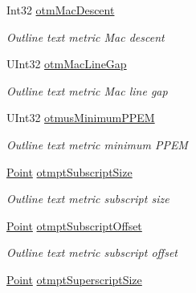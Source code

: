 \begin{DoxyCompactItemize}
Int32 \hyperlink{class_pdf_file_writer_1_1_win_outline_text_metric_aa7dee7dc0aed33e1b7d9a75ba41b73ac}{otm\+Mac\+Descent}
\begin{DoxyCompactList}\small\item\em Outline text metric Mac descent \end{DoxyCompactList}\item 
U\+Int32 \hyperlink{class_pdf_file_writer_1_1_win_outline_text_metric_a998724ff4d6cafd02b16752afe93d433}{otm\+Mac\+Line\+Gap}
\begin{DoxyCompactList}\small\item\em Outline text metric Mac line gap \end{DoxyCompactList}\item 
U\+Int32 \hyperlink{class_pdf_file_writer_1_1_win_outline_text_metric_ae5ab34c524bb3efb5126364c3068d582}{otmus\+Minimum\+P\+P\+EM}
\begin{DoxyCompactList}\small\item\em Outline text metric minimum P\+P\+EM \end{DoxyCompactList}\item 
\hyperlink{namespace_pdf_file_writer_adf167276d483eb5d597fed4e3297ba17a2a3cd5946cfd317eb99c3d32e35e2d4c}{Point} \hyperlink{class_pdf_file_writer_1_1_win_outline_text_metric_aacfcfe5ed598325813742685681f762a}{otmpt\+Subscript\+Size}
\begin{DoxyCompactList}\small\item\em Outline text metric subscript size \end{DoxyCompactList}\item 
\hyperlink{namespace_pdf_file_writer_adf167276d483eb5d597fed4e3297ba17a2a3cd5946cfd317eb99c3d32e35e2d4c}{Point} \hyperlink{class_pdf_file_writer_1_1_win_outline_text_metric_a7eea0c342e1bc5b3c288d3c8667a4287}{otmpt\+Subscript\+Offset}
\begin{DoxyCompactList}\small\item\em Outline text metric subscript offset \end{DoxyCompactList}\item 
\hyperlink{namespace_pdf_file_writer_adf167276d483eb5d597fed4e3297ba17a2a3cd5946cfd317eb99c3d32e35e2d4c}{Point} \hyperlink{class_pdf_file_writer_1_1_win_outline_text_metric_a56bb2214d04b35b74fdc988fc55c92d5}{otmpt\+Superscript\+Size}

\end{DoxyCompactItemize}
